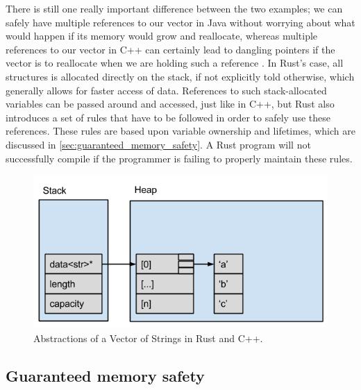 There is still one really important difference between the two examples; we can safely have multiple references to our vector in Java without worrying about what would happen if its memory would grow and reallocate, whereas multiple references to our vector in C++ can certainly lead to dangling pointers if the vector is to reallocate when we are holding such a reference
.
In Rust's case, all structures is allocated directly on the stack, if not explicitly told otherwise, which generally allows for faster access of data.
References to such stack-allocated variables can be passed around and accessed, just like in C++,
but Rust also introduces a set of rules that have to be followed in order to safely use these references.
These rules are based upon variable ownership and lifetimes, which are discussed in \autoref{sec:guaranteed_memory_safety}.
A Rust program will not successfully compile if the programmer is failing to properly maintain these rules.

\begin{figure}[tb]
  \begin{center}
    \includegraphics[scale=0.5]{figures/cpp_abstractions}
  \end{center}
  \caption{Abstractions of a Vector of Strings in Rust and C++.}
  \label{fig:cpp_abstractions}
\end{figure}

\subsection{Guaranteed memory safety}
\label{sec:guaranteed_memory_safety}

